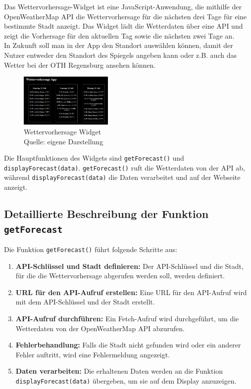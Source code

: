\noindent
Das Wettervorhersage-Widget ist eine JavaScript-Anwendung, die mithilfe der OpenWeatherMap API die Wettervorhersage für die nächsten drei Tage für eine bestimmte Stadt anzeigt. Das Widget lädt die Wetterdaten über eine API und zeigt die Vorhersage für den aktuellen Tag sowie die nächsten zwei Tage an. \\
In Zukunft soll man in der App den Standort auswählen können, damit der Nutzer entweder den Standort des Spiegels angeben kann oder z.B. auch das Wetter bei der OTH Regensburg ansehen können.

\begin{figure}[h]
    \centering
    \includegraphics[width=0.4\textwidth]{pictures/forecast_widget.png}
  \captionsetup{justification=centering, labelformat=simple, singlelinecheck=false}
    \caption[Wettervorhersage Widget]{Wettervorhersage Widget\\ Quelle: eigene Darstellung}
\end{figure}

\noindent
Die Hauptfunktionen des Widgets sind \texttt{getForecast()} und \texttt{displayForecast(data)}. \texttt{getForecast()} ruft die Wetterdaten von der API ab, während \texttt{displayForecast(data)} die Daten verarbeitet und auf der Webseite anzeigt.

\subsection*{Detaillierte Beschreibung der Funktion \texttt{getForecast}}
Die Funktion \texttt{getForecast()} führt folgende Schritte aus:

\begin{enumerate}
    \item \textbf{API-Schlüssel und Stadt definieren:}
    Der API-Schlüssel und die Stadt, für die die Wettervorhersage abgerufen werden soll, werden definiert.
    
    \item \textbf{URL für den API-Aufruf erstellen:}
    Eine URL für den API-Aufruf wird mit dem API-Schlüssel und der Stadt erstellt.
    
    \item \textbf{API-Aufruf durchführen:}
    Ein Fetch-Aufruf wird durchgeführt, um die Wetterdaten von der OpenWeatherMap API abzurufen.
    
    \item \textbf{Fehlerbehandlung:}
    Falls die Stadt nicht gefunden wird oder ein anderer Fehler auftritt, wird eine Fehlermeldung angezeigt.
    
    \item \textbf{Daten verarbeiten:}
    Die erhaltenen Daten werden an die Funktion \texttt{displayForecast(data)} übergeben, um sie auf dem Display anzuzeigen.
\end{enumerate}

